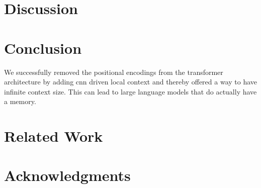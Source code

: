 \documentclass[11pt]{article}
\begin{document}

\section{Discussion}

\section{Conclusion}

We successfully removed the positional encodings from the transformer architecture by adding cnn driven local context and thereby 
offered a way to have infinite context size. This can lead to large language models that do actually have a memory. 




\section{Related Work}

\section*{Acknowledgments}



\end{document}
